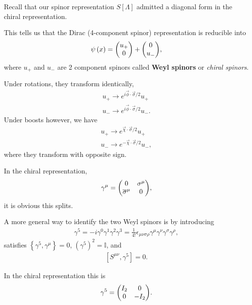 
Recall that our spinor representation $S \left[ \Lambda \right] $ admitted a diagonal form in the chiral representation.

This tells us that the Dirac (4-component spinor) representation is reducible into
\begin{align}
    \psi \left( x \right) = \mqty( u_+ \\ 0 ) + \mqty( 0 \\ u_- )
,\end{align}
where $u_+$ and $u_-$ are 2 component spinors called \textbf{Weyl spinors} or \textit{chiral spinors}.

Under rotations, they transform identically,
\begin{align}
    u_+ \to e^{i \vec{\phi} \cdot \vec{\sigma} / 2} u_+ \\
    u_- \to e^{i \vec{\phi} \cdot \vec{\sigma}/2} u_-
.\end{align}
Under boosts however, we have
\begin{align}
    u_+ \to e^{\vec{\chi} \cdot \vec{\sigma} / 2} u_+ \\
    u_- \to e^{-\vec{\chi} \cdot \vec{\sigma} / 2} u_-
,\end{align}
where they transform with opposite sign.

In the chiral representation,
\begin{align}
    \gamma^{\mu} = \mqty( 0 & \sigma^{\mu} \\ \overline{\sigma}^{\mu} & 0 )
,\end{align}
it is obvious this splits.

A more general way to identify the two Weyl spinors is by introducing
\begin{align}
    \gamma^{5} = -i\gamma^{0} \gamma^{1} \gamma^{2} \gamma^{3} = \frac{1}{4!}\epsilon_{\mu \nu \sigma \rho} \gamma^{\mu} \gamma^{\nu} \gamma^{\sigma} \gamma^{\rho}
,\end{align}
satisfies $\left\{ \gamma^{5}, \gamma^{\mu} \right\} =0 $, $\left( \gamma^{5} \right)^2 = \mathbb{I}$, and
\begin{align}
    \left[ S^{\mu \nu}, \gamma^{5} \right] = 0
.\end{align}

In the chiral representation this is
\begin{align}
    \gamma^{5} = \mqty( I_2 & 0 \\ 0 & -I_2 )
.\end{align}

